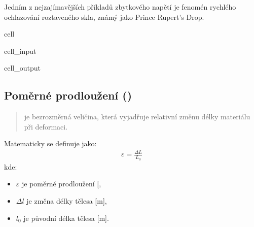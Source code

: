 \documentclass[letterpaper,10pt,english]{jupyterBook}
\begin{document}
\sphinxAtStartPar
Jedním z nejzajímavějších příkladů zbytkového napětí je fenomén rychlého ochlazování roztaveného skla, známý jako Prince Rupert’s Drop.

\begin{sphinxuseclass}{cell}\begin{sphinxVerbatimInput}

\begin{sphinxuseclass}{cell_input}
\begin{sphinxVerbatim}[commandchars=\\\{\}]
\end{sphinxVerbatim}

\end{sphinxuseclass}\end{sphinxVerbatimInput}
\begin{sphinxVerbatimOutput}

\begin{sphinxuseclass}{cell_output}
\noindent{}

\end{sphinxuseclass}\end{sphinxVerbatimOutput}

\end{sphinxuseclass}

\subsection{Poměrné prodloužení ()}
\label{\detokenize{Prednasky/2_2_Hooke_u016fv_z_xe1kon:pomerne-prodlouzeni-strain}}\begin{quote}

\sphinxAtStartPar
{} je bezrozměrná veličina, která vyjadřuje relativní změnu délky materiálu při deformaci.
\end{quote}

\noindent{}

\sphinxAtStartPar
Matematicky se definuje jako:
\begin{equation*}
\begin{split}
\varepsilon = \frac{\Delta L}{L_0}
\end{split}
\end{equation*}
\sphinxAtStartPar
kde:
\begin{itemize}
\item {} 
\sphinxAtStartPar
\(\varepsilon \) je poměrné prodloužení {[}\sphinxhyphen{}{]},

\item {} 
\sphinxAtStartPar
\(\Delta l \) je změna délky tělesa {[}m{]},

\item {} 
\sphinxAtStartPar
\(l_0 \) je původní délka tělesa {[}m{]}.

\end{itemize}
\end{document}
